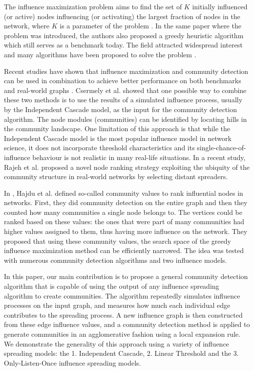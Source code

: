 \documentclass[pdflatex,sn-mathphys-num]{sn-jnl}
\begin{document}
The influence maximization problem aims to find the set of $K$ initially influenced (or active) nodes influencing (or activating) the largest fraction of nodes in the network, where $K$ is a parameter of the problem \cite{kempe}. In the same paper where the problem was introduced, the authors also proposed a greedy heuristic algorithm which still serves as a benchmark today. The field attracted widespread interest and many algorithms have been proposed to solve the problem \cite{lisurvey}.

Recent studies have shown that influence maximization and community detection can be used in combination to achieve better performance on both benchmarks and real-world graphs \cite{csermely, rajeh, evaluating}. Csermely et al. \cite{csermely} showed that one possible way to combine these two methods is to use the results of a simulated influence process, usually by the Independent Cascade model, as the input for the community detection algorithm. The node modules (communities) can be identified by locating hills in the community landscape. One limitation of this approach is that while the Independent Cascade model is the most popular influence model in network science, it does not incorporate threshold characteristics and its single-chance-of-influence behaviour is not realistic in many real-life situations. In a recent study, Rajeh et al. \cite{rajeh} proposed a novel node ranking strategy exploiting the ubiquity of the community structure in real-world networks by selecting distant spreaders.

In \cite{evaluating}, Hajdu et al. defined so-called community values to rank influential nodes in networks. First, they did community detection on the entire graph and then they counted how many communities a single node belongs to. The vertices could be ranked based on these values: the ones that were part of many communities had higher values assigned to them, thus having more influence on the network. They proposed that using these community values, the search space of the greedy influence maximization method can be efficiently narrowed. The idea was tested with numerous community detection algorithms and two influence models.

In this paper, our main contribution is to propose a general community detection algorithm that is capable of using the output of any influence spreading algorithm to create communities. The algorithm repeatedly simulates influence processes on the input graph, and measures how much each individual edge contributes to the spreading process. A new influence graph is then constructed from these edge influence values, and a community detection method is applied to generate communities in an agglomerative fashion using a local expansion rule. We demonstrate the generality of this approach using a variety of influence spreading models: the 1. Independent Cascade, 2. Linear Threshold and the 3. Only-Listen-Once influence spreading models.
\end{document}
